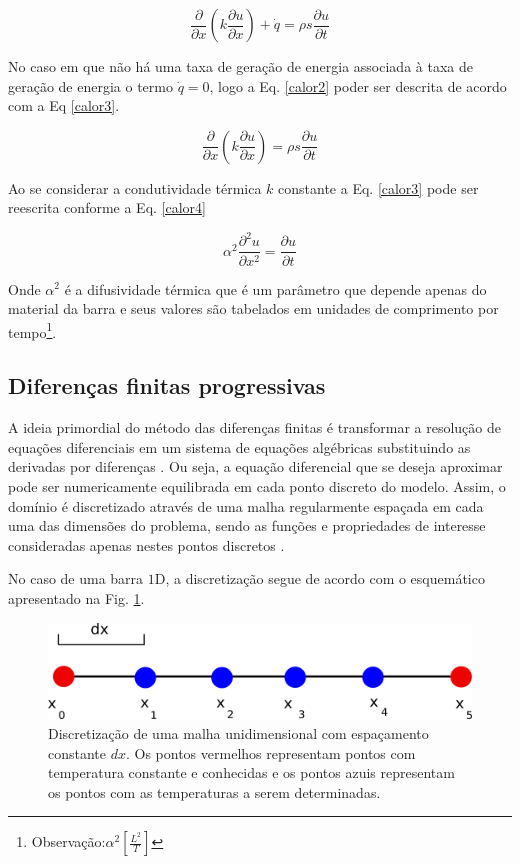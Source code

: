 \documentclass[12pt,a4paper,final]{report}%
\begin{document}
\begin{equation}
\frac{\partial}{\partial x} (k \frac{\partial u}{\partial x}) + \dot{q} = \rho s \frac{\partial u}{\partial t}
\label{calor2}
\end{equation}

No caso em que não há uma taxa de geração de energia associada à taxa de geração de energia o termo $\dot{q}=0$, logo a Eq. \ref{calor2} poder ser descrita de acordo com a Eq \ref{calor3}. 


\begin{equation}
\frac{\partial}{\partial x} (k \frac{\partial u}{\partial x}) = \rho s \frac{\partial u}{\partial t}
\label{calor3}
\end{equation}

Ao se considerar a condutividade térmica $k$ constante a Eq. \ref{calor3} pode ser reescrita conforme a Eq. \ref{calor4}


\begin{equation}
\alpha^{2} \frac{\partial^{2} u}{\partial x^{2}} = \frac{\partial u}{\partial t}
\label{calor4}
\end{equation}

Onde $\alpha^{2}$ é a difusividade térmica que é um parâmetro que depende apenas do material da barra e seus valores são tabelados em unidades de comprimento por tempo\footnote{Observação:$ \alpha^{2}\left[\frac{L^{2}}{T}\right]$}.

\subsection*{Diferenças finitas progressivas}


A ideia primordial do método das diferenças finitas é transformar a resolução de equações diferenciais em um sistema de equações algébricas substituindo as derivadas por diferenças \citep{Melo2011}. Ou seja, a equação diferencial que se deseja aproximar pode ser numericamente equilibrada em cada ponto discreto do modelo. Assim, o domínio é discretizado através de uma malha regularmente espaçada em cada uma das dimensões do problema, sendo as funções e propriedades de interesse consideradas apenas nestes pontos discretos \citep{Bartolo2010}.

No caso de uma barra $1$D, a discretização segue de acordo com o esquemático apresentado na Fig. \ref{Discretizacao}.

\begin{figure}[H]
\centering
\includegraphics[scale=1]{Imagens/Discretizacao1d.png}
\caption{Discretização de uma malha unidimensional com espaçamento constante $dx$. Os pontos vermelhos representam pontos com temperatura constante e conhecidas e os pontos azuis representam os pontos com as temperaturas a serem determinadas.}
\label{Discretizacao}
\end{figure}
\end{document}
